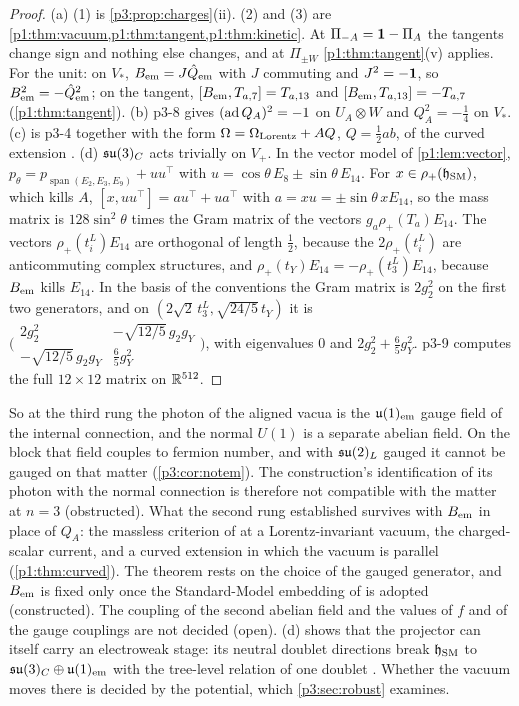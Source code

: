 \begin{proof}
(a) (1) is \cref{p3:prop:charges}(ii). (2) and (3) are \cref{p1:thm:vacuum,p1:thm:tangent,p1:thm:kinetic}. At $\Pi_{-A}=\mathbf 1-\Pi_A$ the tangents change sign and nothing
else changes, and at $\Pi_{\pm W}$ \cref{p1:thm:tangent}(v) applies. For the unit: on $V_*$, $B_{\rm em}=J\hat Q_{\rm em}$ with $J$ commuting and $J^2=-\mathbf 1$, so
$B_{\rm em}^2=-\hat Q_{\rm em}^2$; on the tangent, $[B_{\rm em},T_{a,7}]=T_{a,13}$ and $[B_{\rm em},T_{a,13}]=-T_{a,7}$ (\cref{p1:thm:tangent}). (b) p3-8 gives
$(\operatorname{ad} Q_A)^2=-1$ on $U_A\otimes W$ and $Q_A^2=-\tfrac14$ on $V_*$. (c) is p3-4 together with the form $\Omega=\Omega_{\rm Lorentz}+AQ$, $Q=\tfrac12ab$, of the curved
extension \cite[Thm.~26.8]{ES17}. (d) $\mathfrak{su}(3)_C$ acts trivially on $V_+$. In the vector model of \cref{p1:lem:vector}, $p_\theta=p_{\operatorname{span}(E_2,E_3,E_9)}+uu^{\!\top}$ with
$u=\cos\theta\,E_8\pm\sin\theta\,E_{14}$. For $x\in\rho_+(\mathfrak h_{\rm SM})$, which kills $A$, $[x,uu^{\!\top}]=au^{\!\top}+ua^{\!\top}$ with $a=xu=\pm\sin\theta\,xE_{14}$, so
the mass matrix is $128\sin^2\theta$ times the Gram matrix of the vectors $g_a\rho_+(T_a)E_{14}$. The vectors $\rho_+(t^L_i)E_{14}$ are orthogonal of length $\tfrac12$,
because the $2\rho_+(t^L_i)$ are anticommuting complex structures, and $\rho_+(t_Y)E_{14}=-\rho_+(t^L_3)E_{14}$, because $B_{\rm em}$ kills $E_{14}$. In the basis of the
conventions the Gram matrix is $2g_2^2$ on the first two generators, and on $(2\sqrt2\,t^L_3,\sqrt{24/5}\,t_Y)$ it is
$\bigl(\begin{smallmatrix}2g_2^2&-\sqrt{12/5}\,g_2g_Y\\-\sqrt{12/5}\,g_2g_Y&\frac65g_Y^2\end{smallmatrix}\bigr)$, with eigenvalues $0$ and $2g_2^2+\tfrac65g_Y^2$. p3-9 computes
the full $12\times12$ matrix on $\mathbb{R}^{512}$.
\end{proof}

So at the third rung the photon of the aligned vacua is the $\mathfrak{u}(1)_{\rm em}$ gauge field of the internal connection, and the normal $U(1)$ is a separate abelian field. On
the block that field couples to fermion number, and with $\mathfrak{su}(2)_L$ gauged it cannot be gauged on that matter (\cref{p3:cor:notem}). The construction's
identification of its photon with the normal connection is therefore not compatible with the matter at $n=3$ (obstructed). What the second rung established survives
with $B_{\rm em}$ in place of $Q_A$: the massless criterion of \cite[Cor.~26.2]{ES17} at a Lorentz-invariant vacuum, the charged-scalar current, and a curved extension in which
the vacuum is parallel (\cref{p1:thm:curved}). The theorem rests on the choice of the gauged generator, and $B_{\rm em}$ is fixed only once the Standard-Model embedding of
\cite[Section~8]{ES17} is adopted (constructed). The coupling of the second abelian field and the values of $f$ and of the gauge couplings are not decided (open).
(d) shows that the projector can itself carry an electroweak stage: its neutral doublet directions break $\mathfrak h_{\rm SM}$ to
$\mathfrak{su}(3)_C\oplus\mathfrak{u}(1)_{\rm em}$ with the tree-level relation of one doublet \cite{Glashow61,Weinberg67}. Whether the vacuum moves there is decided by the potential, which
\cref{p3:sec:robust} examines.

